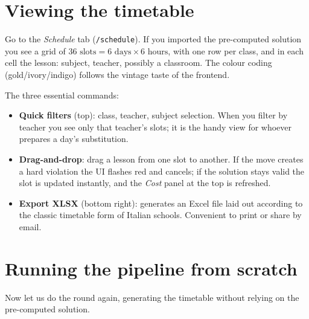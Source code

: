 \section{Viewing the timetable}


Go to the \emph{Schedule} tab (\texttt{/schedule}). If you
imported the pre-computed solution you see a grid of
$36\text{ slots} = 6\text{ days} \times 6\text{ hours}$, with
one row per class, and in each cell the lesson: subject, teacher,
possibly a classroom. The colour coding (gold/ivory/indigo)
follows the vintage taste of the frontend.

The three essential commands:

\begin{itemize}
\item \textbf{Quick filters} (top): class, teacher, subject
  selection. When you filter by teacher you see only that
  teacher's slots; it is the handy view for whoever prepares a
  day's substitution.
\item \textbf{Drag-and-drop}: drag a lesson from one slot to
  another. If the move creates a hard violation the UI flashes
  red and cancels; if the solution stays valid the slot is
  updated instantly, and the \emph{Cost} panel at the top is
  refreshed.
\item \textbf{Export XLSX} (bottom right): generates an Excel file
  laid out according to the classic timetable form of Italian
  schools. Convenient to print or share by email.
\end{itemize}

\section{Running the pipeline from scratch}


Now let us do the round again, generating the timetable without
relying on the pre-computed solution.

